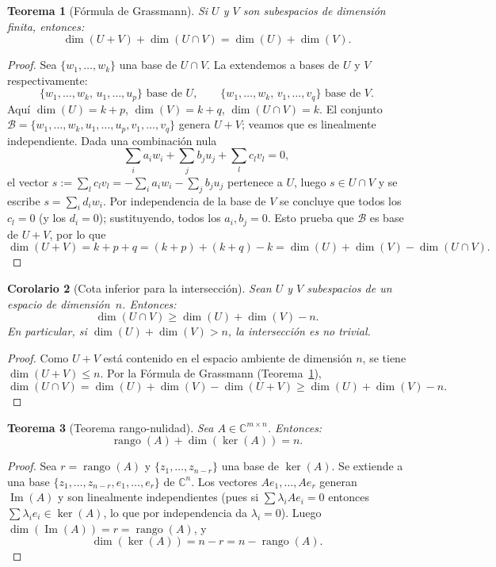 \documentclass[a4paper,11pt]{report}
\newtheorem{theorem}{Teorema}[chapter]
\newtheorem{corollary}[theorem]{Corolario}
\begin{document}
\begin{theorem}[Fórmula de Grassmann]\label{thm:grassmann}
Si $U$ y $V$ son subespacios de dimensión finita, entonces:
\[
\dim(U + V) + \dim(U \cap V) = \dim(U) + \dim(V).
\]
\end{theorem}

\begin{proof}
Sea $\{w_1,\ldots,w_k\}$ una base de $U \cap V$. La extendemos a bases de $U$ y $V$ respectivamente:
\[
\{w_1,\ldots,w_k,\,u_1,\ldots,u_p\} \text{ base de } U,\qquad
\{w_1,\ldots,w_k,\,v_1,\ldots,v_q\} \text{ base de } V.
\]
Aquí $\dim(U)=k+p$, $\dim(V)=k+q$, $\dim(U\cap V)=k$. El conjunto
$\mathcal{B}=\{w_1,\ldots,w_k,u_1,\ldots,u_p,v_1,\ldots,v_q\}$ genera $U+V$;
veamos que es linealmente independiente. Dada una combinación nula
\[
\textstyle\sum_i a_i w_i + \sum_j b_j u_j + \sum_l c_l v_l = 0,
\]
el vector $s := \sum_l c_l v_l = -\sum_i a_i w_i - \sum_j b_j u_j$ pertenece a $U$, luego
$s \in U \cap V$ y se escribe $s = \sum_i d_i w_i$. Por independencia de la base de $V$ se concluye que todos los $c_l = 0$ (y los $d_i = 0$); sustituyendo, todos los $a_i,b_j = 0$. Esto prueba que $\mathcal{B}$ es base de $U+V$, por lo que
\[
\dim(U+V) = k+p+q = (k+p)+(k+q)-k = \dim(U)+\dim(V)-\dim(U\cap V).
\]
\end{proof}

\begin{corollary}[Cota inferior para la intersección]\label{cor:dim_interseccion}
Sean $U$ y $V$ subespacios de un espacio de dimensión~$n$. Entonces:
\[
\dim(U \cap V) \geq \dim(U) + \dim(V) - n.
\]
En particular, si $\dim(U)+\dim(V)>n$, la intersección es no trivial.
\end{corollary}

\begin{proof}
Como $U+V$ está contenido en el espacio ambiente de dimensión $n$, se tiene $\dim(U+V)\le n$.
Por la Fórmula de Grassmann (Teorema~\ref{thm:grassmann}),
\[
\dim(U\cap V) = \dim(U)+\dim(V)-\dim(U+V) \ge \dim(U)+\dim(V)-n.
\]
\end{proof}

\begin{theorem}[Teorema rango-nulidad]\label{thm:rango_nulidad}
Sea $A\in\mathbb{C}^{m\times n}$. Entonces:
\[
\operatorname{rango}(A) + \dim(\ker(A)) = n.
\]
\end{theorem}

\begin{proof}
Sea $r=\operatorname{rango}(A)$ y $\{z_1,\ldots,z_{n-r}\}$ una base de $\ker(A)$. Se extiende a una base $\{z_1,\ldots,z_{n-r},e_1,\ldots,e_r\}$ de $\mathbb{C}^n$. Los vectores $Ae_1,\ldots,Ae_r$ generan $\operatorname{Im}(A)$ y son linealmente independientes (pues si $\sum \lambda_i Ae_i=0$ entonces $\sum\lambda_i e_i\in\ker(A)$, lo que por independencia da $\lambda_i=0$). Luego $\dim(\operatorname{Im}(A))=r=\operatorname{rango}(A)$, y
\[
\dim(\ker(A)) = n - r = n - \operatorname{rango}(A).
\]
\end{proof}
\end{document}
